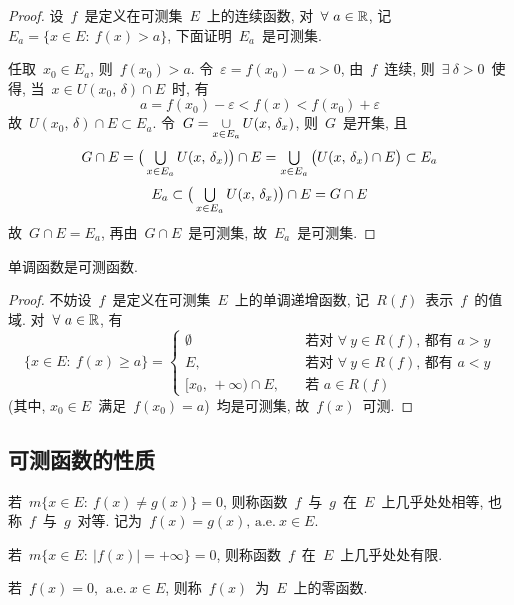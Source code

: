 \begin{proof}
设~$f$~是定义在可测集~$E$~上的连续函数, 对~$\forall~a \in \mathbb{R}$, 记~$E_a = \{x \in E: \: f(x) > a\}$, 下面证明~$E_a$~是可测集.

任取~$x_0 \in E_a$, 则~$f(x_0) > a$. 令~$\varepsilon = f(x_0) - a > 0$, 由~$f$~连续, 则~$\exists~\delta > 0$~使得, 当~$x \in U(x_0,\,\delta) \cap E$~时, 有
\[
a = f(x_0) - \varepsilon < f(x) < f(x_0) + \varepsilon
\]
故~$U(x_0,\,\delta) \cap E \subset E_a$. 令~$G = \mathop{\cup}\limits_{x \in E_a} U(x,\,\delta_x)$, 则~$G$~是开集, 且
\[
G \cap E = \big( \mathop{\textstyle{\bigcup}}_{x \in E_a} U(x,\,\delta_x) \big) \cap E = \mathop{\textstyle{\bigcup}}_{x \in E_a} \big( U(x,\,\delta_x) \cap E \big) \subset E_a
\]
\[
E_a \subset \big( \mathop{\textstyle{\bigcup}}_{x \in E_a} U(x,\,\delta_x) \big) \cap E = G \cap E
\]
故~$G \cap E = E_a$, 再由~$G \cap E$~是可测集, 故~$E_a$~是可测集.
\end{proof}

\begin{example}
单调函数是可测函数.
\end{example}

\begin{proof}
不妨设~$f$~是定义在可测集~$E$~上的单调递增函数, 记~$R(f)$~表示~$f$~的值域.
对~$\forall~a \in \mathbb{R}$, 有
\[
\{x \in E: \: f(x) \geqslant a\} = \left\{\!\!
\begin{array}{cl}
\emptyset & \quad \mbox{若对~}\forall~ y \in R(f), \, \mbox{都有~} a > y \\[0.1cm]
E, & \quad \mbox{若对~}\forall~ y \in R(f), \, \mbox{都有~} a < y \\[0.1cm]
{[}x_0,\,+\infty) \cap E, & \quad \mbox{若~} a \in R(f)
\end{array}
\right.
\]
(其中, $x_0 \in E$~满足~$f(x_0) = a$)~均是可测集, 故~$f(x)$~可测.
\end{proof}

\subsection{可测函数的性质}

\begin{definition}
若~$m\{x \in E: \: f(x) \neq g(x)\} = 0$, 则称函数~$f$~与~$g$~在~$E$~上几乎处处相等, 也称~$f$~与~$g$~对等. 记为~$f(x) = g(x), \, \mathrm{a.e.~} x \in E$.

若~$m\{x \in E: \: |f(x)| = + \infty\} = 0$, 则称函数~$f$~在~$E$~上几乎处处有限.

若~$f(x) = 0, \, \mathrm{~a.e.~} x \in E$, 则称~$f(x)$~为~$E$~上的零函数.
\end{definition}

